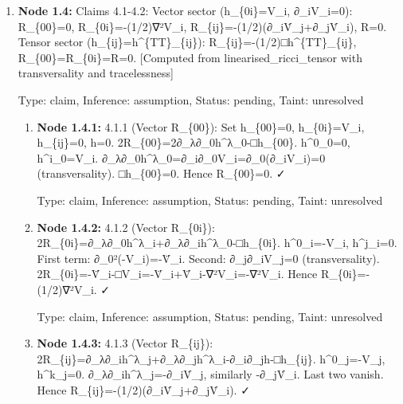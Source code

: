 \documentclass{article}
\begin{document}
\begin{enumerate}
\begin{enumerate}
  Type: claim, Inference: assumption, Status: pending, Taint: unresolved

\item \textbf{Node 1.3.4:} 3.1.4 (R\textasciicircum{}(1)): Using R\textasciicircum{}(1)=∂\_μ∂\_νh\textasciicircum{}\{μν\}-□h. ∂\_μ∂\_νh\textasciicircum{}\{μν\}=∂\_0²h\textasciicircum{}\{00\}+∂\_i∂\_jh\textasciicircum{}\{ij\}=2Φ̈+2∇²ψ. □h=(-∂\_t²+∇²)(-2Φ+6ψ)=2Φ̈-6ψ̈-2∇²Φ+6∇²ψ. Therefore R\textasciicircum{}(1)=2Φ̈+2∇²ψ-2Φ̈+6ψ̈+2∇²Φ-6∇²ψ=2∇²Φ-4∇²ψ+6ψ̈. ✓ QED.

  Type: claim, Inference: assumption, Status: pending, Taint: unresolved

\end{enumerate}
\item \textbf{Node 1.4:} Claims 4.1-4.2: Vector sector (h\_\{0i\}=V\_i, ∂\_iV\_i=0): R\_\{00\}=0, R\_\{0i\}=-(1/2)∇²V\_i, R\_\{ij\}=-(1/2)(∂\_iV̇\_j+∂\_jV̇\_i), R=0. Tensor sector (h\_\{ij\}=h\textasciicircum{}\{TT\}\_\{ij\}): R\_\{ij\}=-(1/2)□h\textasciicircum{}\{TT\}\_\{ij\}, R\_\{00\}=R\_\{0i\}=R=0. [Computed from linearised\_ricci\_tensor with transversality and tracelessness]

  Type: claim, Inference: assumption, Status: pending, Taint: unresolved

\begin{enumerate}
\item \textbf{Node 1.4.1:} 4.1.1 (Vector R\_\{00\}): Set h\_\{00\}=0, h\_\{0i\}=V\_i, h\_\{ij\}=0, h=0. 2R\_\{00\}=2∂\_λ∂\_0h\textasciicircum{}λ\_0-□h\_\{00\}. h\textasciicircum{}0\_0=0, h\textasciicircum{}i\_0=V\_i. ∂\_λ∂\_0h\textasciicircum{}λ\_0=∂\_i∂\_0V\_i=∂\_0(∂\_iV\_i)=0 (transversality). □h\_\{00\}=0. Hence R\_\{00\}=0. ✓

  Type: claim, Inference: assumption, Status: pending, Taint: unresolved

\item \textbf{Node 1.4.2:} 4.1.2 (Vector R\_\{0i\}): 2R\_\{0i\}=∂\_λ∂\_0h\textasciicircum{}λ\_i+∂\_λ∂\_ih\textasciicircum{}λ\_0-□h\_\{0i\}. h\textasciicircum{}0\_i=-V\_i, h\textasciicircum{}j\_i=0. First term: ∂\_0²(-V\_i)=-V̈\_i. Second: ∂\_j∂\_iV\_j=0 (transversality). 2R\_\{0i\}=-V̈\_i-□V\_i=-V̈\_i+V̈\_i-∇²V\_i=-∇²V\_i. Hence R\_\{0i\}=-(1/2)∇²V\_i. ✓

  Type: claim, Inference: assumption, Status: pending, Taint: unresolved

\item \textbf{Node 1.4.3:} 4.1.3 (Vector R\_\{ij\}): 2R\_\{ij\}=∂\_λ∂\_ih\textasciicircum{}λ\_j+∂\_λ∂\_jh\textasciicircum{}λ\_i-∂\_i∂\_jh-□h\_\{ij\}. h\textasciicircum{}0\_j=-V\_j, h\textasciicircum{}k\_j=0. ∂\_λ∂\_ih\textasciicircum{}λ\_j=-∂\_iV̇\_j, similarly -∂\_jV̇\_i. Last two vanish. Hence R\_\{ij\}=-(1/2)(∂\_iV̇\_j+∂\_jV̇\_i). ✓


\end{enumerate}
\end{enumerate}
\end{document}
